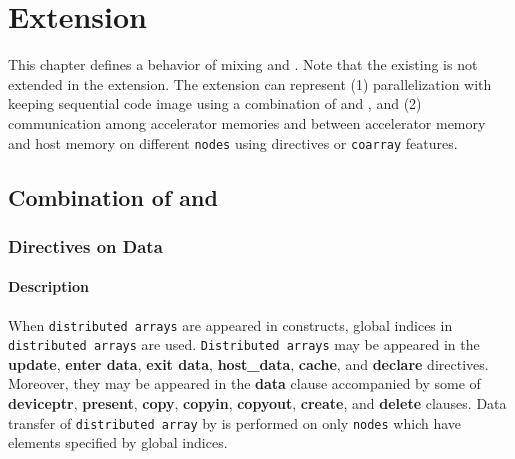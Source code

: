 \chapter{{\XMP} Extension}\label{chap:xmp-ex}
This chapter defines a behavior of mixing {\XMP} and {\OACC}.
Note that the existing {\OACC} is not extended in the {\XMP} extension.
The {\XMP} extension can represent 
(1) parallelization with keeping sequential code image using a combination of {\XMP} and {\OACC},
and
(2) communication among accelerator memories and between accelerator memory and host memory on different {\tt nodes}
using {\XACC} directives or {\tt coarray} features.

\section{Combination of {\XMP} and {\OACC}}
\subsection{{\OACC} Directives on Data}
\subsubsection*{Description}
When {\tt distributed arrays} are appeared in {\OACC} constructs,
global indices in {\tt distributed arrays} are used.
{\tt Distributed arrays} may be appeared in the {\OACC} {\bf update}, {\bf enter data}, {\bf exit data}, 
{\bf host\_data}, {\bf cache}, and {\bf declare} directives.
Moreover, 
they may be appeared in the {\bf data} clause accompanied by some of 
{\bf deviceptr}, {\bf present}, {\bf copy}, {\bf copyin}, 
{\bf copyout}, {\bf create}, and {\bf delete} clauses.
Data transfer of {\tt distributed array} by {\OACC} is performed on only {\tt nodes} which have elements specified by global indices.

